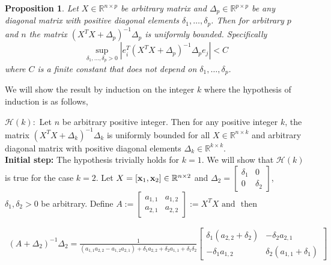 \documentclass[noinfoline,11pt]{imsart}
\numberwithin{equation}{section}
\theoremstyle{plain}
\newtheorem{prop}{Proposition}[section]
\newcommand{\lmDelta}{\Delta}
\newcommand{\lmdelta}{\delta}
\newcommand{\lmX}{X}
\newcommand{\R}{\mathbb{R}}
\newcommand{\lmA}{A}
\newcommand{\lma}{a}
\newcommand{\lmxbf}{{\bf x}}
\begin{document}
 
 
 
 
 
 
 
 
 
 
 
\begin{prop}\label{result:lmUnifBound1}
Let $\lmX\in \R^{n\times p}$ be arbitrary matrix and $\lmDelta_p\in \R^{p\times p}$ be any diagonal matrix with positive diagonal elements $\lmdelta_1, \ldots, \lmdelta_p$. Then for arbitrary $p$ and $n$ the matrix $ \left( \lmX^T\lmX+\lmDelta_p \right)^{-1}\lmDelta_p  $ is uniformly bounded. Specifically 
$$ \sup_{\lmdelta_1, \ldots, \lmdelta_p>0}\left\vert e_{i}^T  \left( \lmX^T\lmX+\lmDelta_p \right)^{-1}\lmDelta_p e_j \right\vert<C  $$
where $C$ is a finite constant that does not depend on $\lmdelta_1, \ldots, \lmdelta_p$. 
\end{prop} 
 

 
 
 
 \proof
 We will show the result by induction on the integer $k$ where the hypothesis of induction is as follows,
  
$  \mathcal{H}(k): $ Let $n$ be arbitrary positive integer. Then for any positive integer $k$,  the matrix   $\left( \lmX^T\lmX+\lmDelta_k \right)^{-1}\lmDelta_k$ is uniformly bounded for all $X\in \R^{n\times k}$  and arbitrary diagonal matrix with positive diagonal elements $\lmDelta_k\in \R^{k\times k}$.  \\

 
 
 {\bf Initial step: }  The hypothesis  trivially  holds for $k=1$. We will show that $\mathcal{H}(k)$ is true for the case  $k=2.$ Let $\lmX=\left[\lmxbf_1, \lmxbf_2  \right] \in \R^{n\times 2}$ and  $ \lmDelta_2=\begin{bmatrix}
 \lmdelta_{1} & 0\\
0 & \lmdelta_{2}
\end{bmatrix}$, $\lmdelta_{1}, \lmdelta_{2}>0$ be arbitrary.  Define 
 $\lmA:=\begin{bmatrix}
 \lma_{1,1} & \lma_{1,2}\\
\lma_{2,1} & \lma_{2,2}
\end{bmatrix} :=\lmX^T\lmX \text{ and }   \text{ then }$

\begin{eqnarray}
\left( \lmA+\lmDelta_2 \right)^{-1}\lmDelta_2
=\frac{1}{(\lma_{1,1}\lma_{2,2}-\lma_{1,2}\lma_{2,1})+ \lmdelta_1\lma_{2,2}+\lmdelta_2\lma_{1,1}+ \lmdelta_1\lmdelta_2}
  \begin{bmatrix}
 \lmdelta_1(\lma_{2,2}+\lmdelta_2) & -\lmdelta_2\lma_{2,1}\\
-\lmdelta_1\lma_{1,2} & \lmdelta_2(\lma_{1,1}+\lmdelta_1)
\end{bmatrix}  \nonumber
\end{eqnarray}
\end{document}
